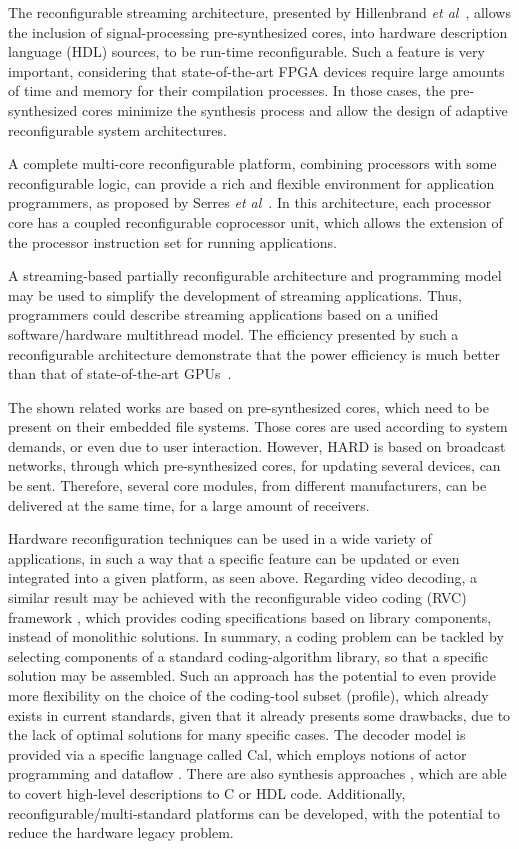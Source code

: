 The reconfigurable streaming architecture, presented by Hillenbrand {\em et al}~\cite{ref15}, allows the inclusion of signal-processing pre-synthesized cores, into hardware description language (HDL) sources, to be run-time reconfigurable. Such a feature is very important, considering that state-of-the-art FPGA devices require large amounts of time and memory for their compilation processes. In those cases, the pre-synthesized cores minimize the synthesis process and allow the design of adaptive reconfigurable system architectures. 

A complete multi-core reconfigurable platform, combining processors with some reconfigurable logic, can provide a rich and flexible environment for application programmers, as proposed by Serres {\em et al}~\cite{ref16}. In this architecture, each processor core has a coupled reconfigurable coprocessor unit, which allows the extension of the processor instruction set for running applications.

A streaming-based partially reconfigurable architecture and programming model may be used to simplify the development of streaming applications. Thus, programmers could describe streaming applications based on a unified software/hardware multithread model. The efficiency presented by such a reconfigurable architecture demonstrate that the power efficiency is much better than that of state-of-the-art GPUs~\cite{refX1}.

The shown related works are based on pre-synthesized cores, which need to be present on their embedded file systems. Those cores are used according to system demands, or even due to user interaction. However, HARD is based on broadcast networks, through which pre-synthesized cores, for updating several devices, can be sent. Therefore, several core modules, from different manufacturers, can be delivered at the same time, for a large amount of receivers.

Hardware reconfiguration techniques can be used in a wide variety of applications, in such a way that a specific feature can be updated or even integrated into a given platform, as seen above. Regarding video decoding, a similar result may be achieved with the reconfigurable video coding (RVC) framework \cite{ref34,ref40}, which provides coding specifications based on library components, instead of monolithic solutions. In summary, a coding problem can be tackled by selecting components of a standard coding-algorithm library, so that a specific solution may be assembled. Such an approach has the potential to even provide more flexibility on the choice of the coding-tool subset (profile), which already exists in current standards, given that it already presents some drawbacks, due to the lack of optimal solutions for many specific cases. The decoder model is provided via a specific language called Cal, which employs notions of actor programming and dataflow \cite{ref34,ref37}. There are also synthesis approaches \cite{ref37,ref35,ref36,ref39,ref41}, which are able to covert high-level descriptions to C or HDL code. Additionally, reconfigurable/multi-standard platforms \cite{ref38} can be developed, with the potential to reduce the hardware legacy problem.

